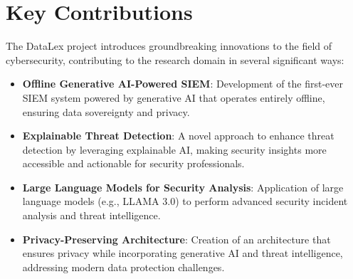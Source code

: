 \section{Key Contributions}
\label{sec_key_contributions}

The DataLex project introduces groundbreaking innovations to the field of cybersecurity, contributing to the research domain in several significant ways:

\begin{itemize}
    \item \textbf{Offline Generative AI-Powered SIEM}: Development of the first-ever SIEM system powered by generative AI that operates entirely offline, ensuring data sovereignty and privacy.
    \item \textbf{Explainable Threat Detection}: A novel approach to enhance threat detection by leveraging explainable AI, making security insights more accessible and actionable for security professionals.
    \item \textbf{Large Language Models for Security Analysis}: Application of large language models (e.g., LLAMA 3.0) to perform advanced security incident analysis and threat intelligence.
    \item \textbf{Privacy-Preserving Architecture}: Creation of an architecture that ensures privacy while incorporating generative AI and threat intelligence, addressing modern data protection challenges.
\end{itemize}
